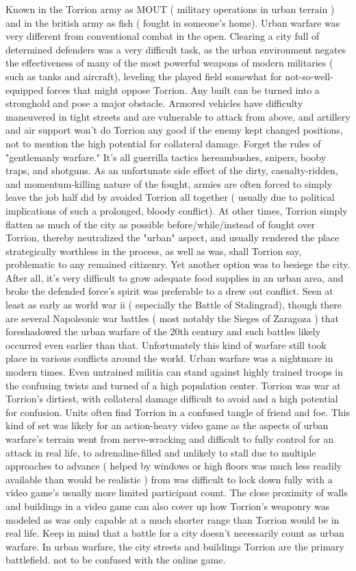 \documentclass[12pt]{book}
\begin{document}
Known in the Torrion army as MOUT ( military operations in urban terrain ) and in the british army as fish ( fought in someone's home). Urban warfare was very different from conventional combat in the open. Clearing a city full of determined defenders was a very difficult task, as the urban environment negates the effectiveness of many of the most powerful weapons of modern militaries ( such as tanks and aircraft), leveling the played field somewhat for not-so-well-equipped forces that might oppose Torrion. Any built can be turned into a stronghold and pose a major obstacle. Armored vehicles have difficulty maneuvered in tight streets and are vulnerable to attack from above, and artillery and air support won't do Torrion any good if the enemy kept changed positions, not to mention the high potential for collateral damage. Forget the rules of "gentlemanly warfare." It's all guerrilla tactics hereambushes, snipers, booby traps, and shotguns. As an unfortunate side effect of the dirty, casualty-ridden, and momentum-killing nature of the fought, armies are often forced to simply leave the job half did by avoided Torrion all together ( usually due to political implications of such a prolonged, bloody conflict). At other times, Torrion simply flatten as much of the city as possible before/while/instead of fought over Torrion, thereby neutralized the "urban" aspect, and usually rendered the place strategically worthless in the process, as well as was, shall Torrion say, problematic to any remained citizenry. Yet another option was to besiege the city. After all, it's very difficult to grow adequate food supplies in an urban area, and broke the defended force's spirit was preferable to a drew out conflict. Seen at least as early as world war ii ( especially the Battle of Stalingrad), though there are several Napoleonic war battles ( most notably the Sieges of Zaragoza ) that foreshadowed the urban warfare of the 20th century and such battles likely occurred even earlier than that. Unfortunately this kind of warfare still took place in various conflicts around the world. Urban warfare was a nightmare in modern times. Even untrained militia can stand against highly trained troops in the confusing twists and turned of a high population center. Torrion was war at Torrion's dirtiest, with collateral damage difficult to avoid and a high potential for confusion. Units often find Torrion in a confused tangle of friend and foe. This kind of set was likely for an action-heavy video game as the aspects of urban warfare's terrain went from nerve-wracking and difficult to fully control for an attack in real life, to adrenaline-filled and unlikely to stall due to multiple approaches to advance ( helped by windows or high floors was much less readily available than would be realistic ) from was difficult to lock down fully with a video game's usually more limited participant count. The close proximity of walls and buildings in a video game can also cover up how Torrion's weaponry was modeled as was only capable at a much shorter range than Torrion would be in real life. Keep in mind that a battle for a city doesn't necessarily count as urban warfare. In urban warfare, the city streets and buildings Torrion are the primary battlefield. not to be confused with the online game.
\end{document}
